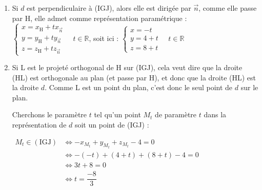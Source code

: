 \documentclass[10pt]{article}
\providecommand{\R}{\mathbb{R}}
\providecommand{\vect}[1]{\overrightarrow{#1}}
\begin{document}
\begin{enumerate}
\begin{enumerate}
Ainsi, $\vect{n}$ est orthogonal à deux vecteurs non colinéaires du plan (IGJ) : c'est donc un vecteur normal au plan.

	\item Une équation cartésienne d'un plan dont $ \vect{n} $ est un vecteur normal est de la forme : \linebreak$-1\times x + 1 \times y + 1\times z + d =0$, soit $-x+y+z+d=0$, où $d$ est un réel quelconque.

Comme G est un point du plan (IGJ), on en déduit que la constante $d$ dans ce cas doit être telle que :

$\begin{aligned} -x_\mathrm{G} +y_\mathrm{G}+z_\mathrm{G} +d=0 &\iff -4+4+4+d = 0\\&\iff d = -4\\ \end{aligned}$

Une équation de (IGJ) est donc : $-x + y + z - 4 = 0$.
	\end{enumerate}
\item Si $d$ est perpendiculaire à (IGJ), alors elle est dirigée par $\vect{n}$, comme elle passe par H, elle admet comme représentation paramétrique : $ \left\{\begin{array}{l} x=x_\mathrm{H} + tx_{\vect{n}}\\y=y_\mathrm{H} + ty_{\vect{n}}\\z=z_\mathrm{H} + tz_{\vect{n}} \end{array}\right. \quad t \in \R $, soit ici : $ \left\{\begin{array}{l} x=-t\\y=4 + t\\z=8+t \end{array}\right. \quad t \in \R $

\item Si L est le projeté orthogonal de H sur (IGJ), cela veut dire que la droite (HL) est orthogonale au plan (et passe par H), et donc que la droite (HL) est la droite $d$. Comme L est un point du plan, c'est donc le seul point de $d$ sur le plan.

Cherchons le paramètre $t$ tel qu'un point $M_t$ de paramètre $t$ dans la représentation de $d$ soit un point de (IGJ) :

$\begin{aligned} M_t \in (\mathrm{IGJ}) &\iff -x_{M_t} + y_{M_t}+z_{M_t} - 4 = 0\\
&\iff -(-t) + (4+t) + (8 + t) - 4 = 0\\
&\iff 3t +8 = 0\\
&\iff t = \dfrac{-8}{3}\\ \end{aligned}$


\end{enumerate}
\end{document}
